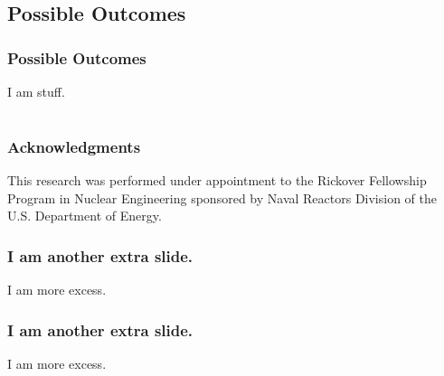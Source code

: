 \documentclass[compress,xcolor=table]{beamer}
\begin{document}
\subsection[Possible Outcomes]{Possible Outcomes}
\begin{frame}
\frametitle{Possible Outcomes}

I am stuff.

\end{frame}
\section*{}
\begin{frame}
\frametitle{Acknowledgments}

This research was performed under appointment to the Rickover Fellowship Program in Nuclear Engineering sponsored by Naval Reactors Division of the U.S. Department of Energy.

\end{frame}
\begin{frame}
\frametitle{I am another extra slide.}

I am more excess.

\end{frame}
\begin{frame}
\frametitle{I am another extra slide.}

I am more excess.

\end{frame}
\end{document}
